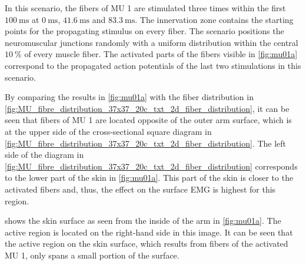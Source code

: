 In this scenario, the fibers of MU 1 are stimulated three times within the first $\SI{100}{\milli\second}$ at $\SI{0}{\milli\second}$, $\SI{41.6}{\milli\second}$ and $\SI{83.3}{\milli\second}$.  The innervation zone contains the starting points for the propagating stimulus on every fiber. The scenario positions the neuromuscular junctions randomly with a uniform distribution within the central $\SI{10}{\percent}$ of every muscle fiber. The activated parts of the fibers visible in \cref{fig:mu01a} correspond to the propagated action potentials of the last two stimulations in this scenario.

By comparing the results in \cref{fig:mu01a} with the fiber distribution in \cref{fig:MU_fibre_distribution_37x37_20c_txt_2d_fiber_distribution}, it can be seen that fibers of MU 1 are located opposite of the outer arm surface, which is at the upper side of the cross-sectional square diagram in \cref{fig:MU_fibre_distribution_37x37_20c_txt_2d_fiber_distribution}. The left side of the diagram in \cref{fig:MU_fibre_distribution_37x37_20c_txt_2d_fiber_distribution} corresponds to the lower part of the skin in \cref{fig:mu01a}. This part of the skin is closer to the activated fibers and, thus, the effect on the surface EMG is highest for this region.

 shows the skin surface as seen from the inside of the arm in \cref{fig:mu01a}. The active region is located on the right-hand side in this image.
It can be seen that the active region on the skin surface, which results from fibers of the activated MU 1, only spans a small portion of the surface.

